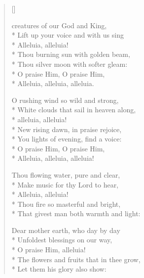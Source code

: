 \newHymn
{}
\begin{verse}[\versewidth]

\begin{patverse}
 creatures of our God and King,\\*
Lift up your voice and with us sing\\*
Alleluia, alleluia!\\*
Thou burning sun with golden beam,\\*
Thou silver moon with softer gleam:\\*
O praise Him, O praise Him,\\*
Alleluia, alleluia, alleluia.
\end{patverse}


\begin{patverse}
O rushing wind so wild and strong,\\*
White clouds that sail in heaven along,\\*
alleluia, alleluia!\\*
New rising dawn, in praise rejoice,\\*
You lights of evening, find a voice:\\*
O praise Him, O praise Him,\\*
Alleluia, alleluia, alleluia!
\end{patverse}

\begin{patverse}
Thou flowing water, pure and clear,\\*
Make music for thy Lord to hear,\\*
Alleluia, alleluia!\\*
Thou fire so masterful and bright,\\*
That givest man both warmth and light:
\end{patverse}

\begin{patverse}
Dear mother earth, who day by day\\*
Unfoldest blessings on our way,\\*
O praise Him, alleluia!\\*
The flowers and fruits that in thee grow,\\*
Let them his glory also show:
\end{patverse}



\end{verse}
